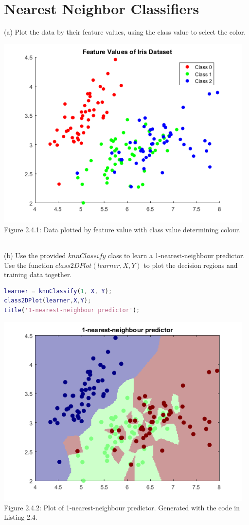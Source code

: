 \documentclass[]{report}   %
\begin{document}
\section{Nearest Neighbor Classifiers}
(a) Plot the data by their feature values, using the class value to select the color.
\begin{center}
	\includegraphics[width=35em]{2_4_Figure_1.png}
	{Figure 2.4.1: Data plotted by feature value with class value determining colour.}
\end{center} 
~\\
(b) Use the provided $knnClassify$ class to learn a 1-nearest-neighbour predictor. Use the function $class2DPlot(learner,X,Y)$ to plot the decision regions and training data together.
\begin{lstlisting}[language=Matlab, caption=Teaching the 1-nearest-neighbour predictor.]
learner = knnClassify(1, X, Y);
class2DPlot(learner,X,Y);
title('1-nearest-neighbour predictor');
\end{lstlisting}
\begin{center}
	\includegraphics[width=35em]{2_4_Figure_2.png}
	{Figure 2.4.2: Plot of 1-nearest-neighbour predictor. Generated with the code in Listing 2.4.}
\end{center} 
\end{document}
